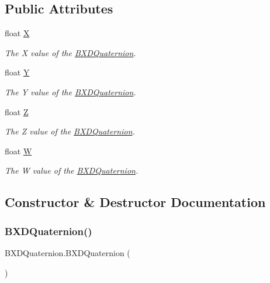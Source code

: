 \subsection*{Public Attributes}
\begin{DoxyCompactItemize}
\item 
float \hyperlink{class_b_x_d_quaternion_a37535ef51676bd109b9c13049230696b}{X}
\begin{DoxyCompactList}\small\item\em The X value of the \hyperlink{class_b_x_d_quaternion}{B\+X\+D\+Quaternion}. \end{DoxyCompactList}\item 
float \hyperlink{class_b_x_d_quaternion_a372aeace6dc0ec9659e10da7ec95e793}{Y}
\begin{DoxyCompactList}\small\item\em The Y value of the \hyperlink{class_b_x_d_quaternion}{B\+X\+D\+Quaternion}. \end{DoxyCompactList}\item 
float \hyperlink{class_b_x_d_quaternion_a8369bbd60061e761662281ad91ec0f6d}{Z}
\begin{DoxyCompactList}\small\item\em The Z value of the \hyperlink{class_b_x_d_quaternion}{B\+X\+D\+Quaternion}. \end{DoxyCompactList}\item 
float \hyperlink{class_b_x_d_quaternion_a041db6f6882e5480d333bddb9bc2f4f1}{W}
\begin{DoxyCompactList}\small\item\em The W value of the \hyperlink{class_b_x_d_quaternion}{B\+X\+D\+Quaternion}. \end{DoxyCompactList}\end{DoxyCompactItemize}


\subsection{Constructor \& Destructor Documentation}
\mbox{\label{class_b_x_d_quaternion_a423e553992a00c9d4e1422516c200090}} 
\subsubsection{\texorpdfstring{B\+X\+D\+Quaternion()}{BXDQuaternion()}\hspace{0.1cm}{\footnotesize\ttfamily [1/2]}}
{\footnotesize\ttfamily B\+X\+D\+Quaternion.\+B\+X\+D\+Quaternion (\begin{DoxyParamCaption}{ }\end{DoxyParamCaption})}



